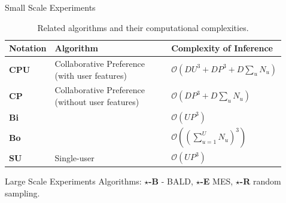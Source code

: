 \documentclass[final]{beamer}
\newlength{\sepwid}
\newlength{\onecolwid}
\begin{document}
\begin{frame}[t]
\begin{columns}[t]
\begin{column}{\onecolwid}
    \end{column}

      \begin{column}{\sepwid}\end{column}   %

      \begin{column}{\onecolwid}

        \begin{block}{Small Scale Experiments}
          \begin{table}[h!]
          \centering
          \caption{Related algorithms and their computational complexities.}
          \begin{tabular}{l|l|l}
            Notation &  Algorithm & Complexity of Inference \\ \hline
            {\bf CPU} & Collaborative Preference (with user features) & $\mathcal{O}(DU^3+DP^3+D\sum_u
            N_u)$  \\
            {\bf CP} & Collaborative Preference (without user features) & $\mathcal{O}(DP^3+D\sum_u
            N_u)$\\
            {\bf Bi} & \cite{birlutiu2009} & $\mathcal{O}(UP^3)$\\
            {\bf Bo} & \cite{bonilla2010} & $\mathcal{O}((\sum_{u=1}^U N_u)^3)$  \\
            {\bf SU} & Single-user \cite{chu2005} & $\mathcal{O}(UP^3)$
          \end{tabular}
          \end{table}

          \vskip-0.5cm
          
        \end{block}

        \begin{block}{Large Scale Experiments}
          Algorithms: {\bf $\star$-B} - BALD, {\bf $\star$-E} MES, {\bf $\star$-R} random sampling.


\end{block}
\end{column}
\end{columns}
\end{frame}
\end{document}
